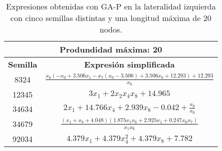 \begin{table}[H]
\centering
\begin{tabular}{|c|c|}
\hline
\multicolumn{2}{|c|}{\textbf{Produndidad máxima: 20}}                                                                                                                     \\ \hline
\textbf{Semilla} & \textbf{Expresión simplificada}                                                                                                                        \\ \hline
8324             & $\frac{x_{6} \left(- x_{0} + 3.506 x_{1} - x_{7} \left(x_{0} - 3.506\right) + 3.506 x_{8} + 12.293\right) + 12.293}{x_{6}}$        \\ \hline
12345            & $3 x_{1} + 2 x_{2} x_{4} x_{8} + 14.965$                                                                                                            \\ \hline
34634            & $2 x_{1} + 14.766 x_{4} + 2.939 x_{8} - 0.042 + \frac{x_{8}}{x_{0}}$                                                                   \\ \hline
34679            & $\frac{\left(x_{1} + x_{8} + 4.048\right) \left(1.875 x_{1} x_{6} + 2.925 x_{1} + 0.247 x_{6} x_{7}\right)}{x_{1} x_{6}}$ \\ \hline
92034            & $4.379 x_{1} + 4.379 x_{4}^{2} + 4.379 x_{8} + 7.782$                                                                                    \\ \hline
\end{tabular}%
\caption{Expresiones obtenidas con GA-P en la lateralidad izquierda con cinco semillas distintas y una longitud máxima de 20 nodos.}\label{table:exp_GAP_l0_20}
\end{table}




